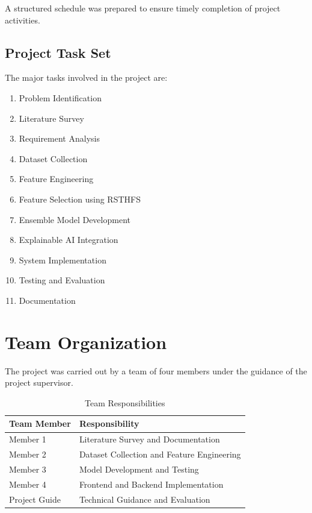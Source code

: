 \documentclass[12pt]{report}
\begin{document}
A structured schedule was prepared to ensure timely completion of project activities.

\subsection{Project Task Set}

The major tasks involved in the project are:

\begin{enumerate}
    \item Problem Identification
    \item Literature Survey
    \item Requirement Analysis
    \item Dataset Collection
    \item Feature Engineering
    \item Feature Selection using RSTHFS
    \item Ensemble Model Development
    \item Explainable AI Integration
    \item System Implementation
    \item Testing and Evaluation
    \item Documentation
\end{enumerate}

\section{Team Organization}

The project was carried out by a team of four members under the guidance of the project supervisor.

\begin{table}[H]
\centering
\caption{Team Responsibilities}
\begin{tabular}{|p{4cm}|p{8cm}|}
\hline
\textbf{Team Member} & \textbf{Responsibility} \\
\hline
Member 1 & Literature Survey and Documentation \\
\hline
Member 2 & Dataset Collection and Feature Engineering \\
\hline
Member 3 & Model Development and Testing \\
\hline
Member 4 & Frontend and Backend Implementation \\
\hline
Project Guide & Technical Guidance and Evaluation \\
\hline
\end{tabular}
\end{table}
\end{document}
